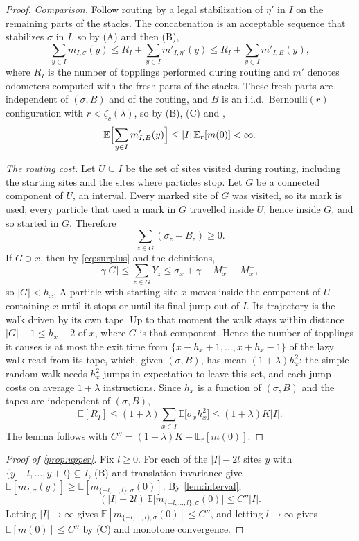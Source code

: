 \documentclass[11pt]{article}
\theoremstyle{remark}
\newcommand{\E}{\mathbb E}
\newcommand{\1}{\mathbf 1}
\begin{document}
\begin{proof}
\emph{Comparison.} Follow routing by a legal stabilization of $\eta'$ in $I$ on the remaining parts of the stacks. The concatenation is an acceptable sequence that stabilizes $\sigma$ in $I$, so by (A) and then (B),
\[
\sum_{y\in I}m_{I,\sigma}(y)\le R_I+\sum_{y\in I}m'_{I,\eta'}(y)\le R_I+\sum_{y\in I}m'_{I,B}(y),
\]
where $R_I$ is the number of topplings performed during routing and $m'$ denotes odometers computed with the fresh parts of the stacks. These fresh parts are independent of $(\sigma,B)$ and of the routing, and $B$ is an i.i.d.\ Bernoulli$(r)$ configuration with $r<\zeta_c(\lambda)$, so by (B), (C) and \cite[Corollary~1.2]{JR},
\[
\E\Bigl[\sum_{y\in I}m'_{I,B}(y)\Bigr]\le |I|\,\E_r[m(0)]<\infty .
\]

\emph{The routing cost.} Let $U\subseteq I$ be the set of sites visited during routing, including the starting sites and the sites where particles stop. Let $G$ be a connected component of $U$, an interval. Every marked site of $G$ was visited, so its mark is used; every particle that used a mark in $G$ travelled inside $U$, hence inside $G$, and so started in $G$. Therefore
\begin{equation}\label{eq:surplus}
\sum_{z\in G}(\sigma_z-B_z)\ge0 .
\end{equation}
If $G\ni x$, then by \eqref{eq:surplus} and the definitions,
\[
\gamma|G|\le\sum_{z\in G}Y_z\le \sigma_x+\gamma+M_x^++M_x^- ,
\]
so $|G|<h_x$. A particle with starting site $x$ moves inside the component of $U$ containing $x$ until it stops or until its final jump out of $I$. Its trajectory is the walk driven by its own tape. Up to that moment the walk stays within distance $|G|-1\le h_x-2$ of $x$, where $G$ is that component. Hence the number of topplings it causes is at most the exit time from $\{x-h_x+1,\dots,x+h_x-1\}$ of the lazy walk read from its tape, which, given $(\sigma,B)$, has mean $(1+\lambda)h_x^2$: the simple random walk needs $h_x^2$ jumps in expectation to leave this set, and each jump costs on average $1+\lambda$ instructions. Since $h_x$ is a function of $(\sigma,B)$ and the tapes are independent of $(\sigma,B)$,
\[
\E[R_I]\le(1+\lambda)\sum_{x\in I}\E\bigl[\sigma_x h_x^2\bigr]\le(1+\lambda)K|I| .
\]
The lemma follows with $C''=(1+\lambda)K+\E_r[m(0)]$.
\end{proof}

\begin{proof}[Proof of \cref{prop:upper}]
Fix $l\ge0$. For each of the $|I|-2l$ sites $y$ with $\{y-l,\dots,y+l\}\subseteq I$, (B) and translation invariance give $\E[m_{I,\sigma}(y)]\ge \E[m_{\{-l,\dots,l\},\sigma}(0)]$. By \cref{lem:interval},
\[
(|I|-2l)\,\E\bigl[m_{\{-l,\dots,l\},\sigma}(0)\bigr]\le C''|I| .
\]
Letting $|I|\to\infty$ gives $\E[m_{\{-l,\dots,l\},\sigma}(0)]\le C''$, and letting $l\to\infty$ gives $\E[m(0)]\le C''$ by (C) and monotone convergence.
\end{proof}
\end{document}
